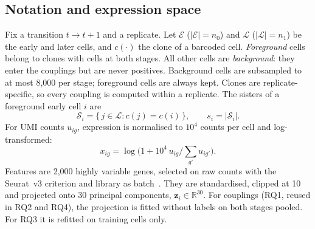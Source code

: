 \documentclass[10pt,journal,compsoc]{IEEEtran}
\begin{document}


\subsection{Notation and expression space}\label{sec:notation}
Fix a transition $t\to t{+}1$ and a replicate. Let $\mathcal{E}$ ($|\mathcal{E}|=n_0$)
and $\mathcal{L}$ ($|\mathcal{L}|=n_1$) be the early and later cells, and $c(\cdot)$ the
clone of a barcoded cell. \emph{Foreground} cells belong to clones with cells at both stages.
All other cells are \emph{background}: they enter the couplings but are never positives.
Background cells are subsampled to at most 8{,}000 per stage; foreground cells are always
kept. Clones are replicate-specific, so every coupling is computed within a replicate. The
sisters of a foreground early cell $i$ are
\begin{equation}
\mathcal{S}_i=\{\,j\in\mathcal{L}: c(j)=c(i)\,\},\qquad s_i=|\mathcal{S}_i|.
\end{equation}
For UMI counts $u_{ig}$, expression is normalised to $10^4$ counts per cell and
log-transformed:
\begin{equation}
x_{ig}=\log\bigl(1+10^{4}\,u_{ig}/\textstyle\sum_{g'}u_{ig'}\bigr).
\label{eq:lognorm}
\end{equation}
Features are 2{,}000 highly variable genes, selected on raw counts with the Seurat~v3
criterion and library as batch~\cite{Stuart_2019,Wolf_2018}. They are standardised,
clipped at 10 and projected onto 30 principal components, $\mathbf{z}_i\in\mathbb{R}^{30}$.
For couplings (RQ1, reused in RQ2 and RQ4), the projection is fitted without labels on both
stages pooled. For RQ3 it is refitted on training cells only.
\end{document}
